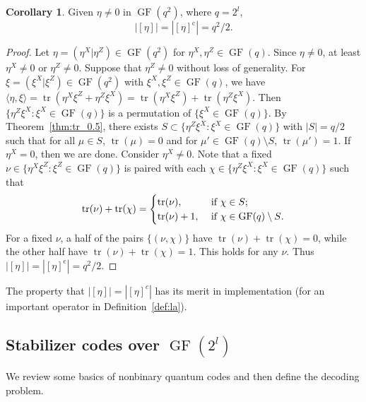 \documentclass{ieeeaccess}
\DeclareMathOperator{\GF}{GF}
\DeclareMathOperator{\tr}{tr}
\theoremstyle{definition}		%
\newtheorem{corollary}{Corollary}
\begin{document}
\begin{corollary} \label{col:tr_half}
	Given  $\eta\ne 0$ in $\GF(q^2)$, {where $q=2^l$,} 
	$$|[\eta]|=|[\eta]^{\text{c}}|=q^2/2.$$
\end{corollary}
\begin{proof}
	Let $\eta= (\eta^X|\eta^Z)\in\GF(q^2)$ for $\eta^X,\eta^Z\in\GF(q)$.
	Since $\eta\neq 0$, at least $\eta^X\neq 0$ or $\eta^Z\neq 0$.	
	Suppose that $\eta^Z\neq 0$ without loss of generality. 
	For $\xi= (\xi^X|\xi^Z)\in\GF(q^2)$ with $\xi^X,\xi^Z\in\GF(q)$,
	we have $\langle \eta,\xi \rangle =  \tr(\eta^X \xi^Z+\eta^Z \xi^X)= \tr(\eta^X \xi^Z)+\tr(\eta^Z \xi^X)$.
	Then $\{ \eta^Z \xi^X: \xi^X\in\GF(q)\}$ is a permutation of $\{\xi^X\in\GF(q)\}$. %
	By Theorem~\ref{thm:tr_0.5}, there exists  $S\subset \{ \eta^Z \xi^X: \xi^X\in\GF(q)\}$  with $|S|=q/2$
	such that for all $\mu\in S$, $\tr(\mu)=0$ and for $\mu'\in\GF(q)\setminus S$, $\tr(\mu')=1$.
	If $\eta^X=0$, then we are done.
	Consider $\eta^X\neq 0$. 
	Note that a fixed $\nu\in\{\eta^X \xi^Z:\xi^Z\in\GF(q)\}$ is paired with each
	${\chi}\in \{\eta^Z \xi^X: \xi^X\in\GF(q)\}$ such that
		\[\tr(\nu)+\tr(\chi)=
		\begin{cases}
		\tr(\nu),& \hbox{ if $\chi\in S$};\\
		\tr(\nu)+1,& \hbox{ if $\chi\in\GF(q)\setminus S$.} \\
		\end{cases}
		\]	
	For a fixed $\nu$, a half of the pairs ${ \{(\nu,\chi)\} }$ have $ \tr(\nu)+\tr(\chi)=0 $, 
	while the other half have $ \tr(\nu)+\tr(\chi)=1 $.
	This holds for any $\nu$. Thus $|[\eta]|=|[\eta]^{\text{c}}|=q^2/2.$
\end{proof}


The property that $|[\eta]|=|[\eta]^c|$ has its merit in implementation (for an important operator in Definition~\ref{def:la}). 




\newcommand*\GFtwol{ $\GF(2^l)$ }						%
\subsection{Stabilizer codes over \protect\GFtwol}		%

We review some basics of nonbinary quantum codes \cite{Kni96a,Kni96b,Rai99,MU00,AK01,KKKS06} and then define the decoding problem.
\end{document}
